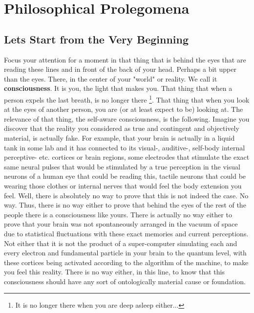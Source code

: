 \documentclass[11pt, a4paper]{article} %
\begin{document}
\newpage
\pagestyle{fancy}

\section*{\centering \huge{Philosophical Prolegomena}} %
\subsection*{Lets Start from the Very Beginning}

Focus your attention for a moment in that thing that is behind the eyes that are reading these lines and in front of the back of your head. Perhaps a bit upper than the eyes. There, in the center of your "world" or reality. We call it {\bf consciousness}. It is you, the light that makes you. That thing that when a person expels the last breath, is no longer there \footnote{It is no longer there when you are deep asleep either...}. That thing that when you look at the eyes of another person, you are (or at least expect to be) looking at. The relevance of that thing, the self-aware consciousness, is the following. Imagine you discover that the reality you considered as true and contingent and objectively material, is actually fake. For example, that your brain is actually in a liquid tank in some lab and it has connected to its visual-, auditive-, self-body internal perceptive- etc. cortices or brain regions, some electrodes that stimulate the exact same neural pulses that would be stimulated by a true perception in the visual neurons of a human eye that could be reading this, tactile neurons that could be wearing those clothes or internal nerves that would feel the body extension you feel. Well, there is absolutely no way to prove that this is not indeed the case. No way. Thus, there is no way either to prove that behind the eyes of the rest of the people there is a consciousness like yours. There is actually no way either to prove that your brain was not spontaneously arranged in the vacuum of space due to statistical fluctuations with these exact memories and current perceptions. Not either that it is not the product of a super-computer simulating each and every electron and fundamental particle in your brain to the quantum level, with these cortices being activated according to the algorithm of the machine, to make you feel this reality. There is no way either, in this line, to know that this consciousness should have any sort of ontologically material cause or foundation. \vspace{-0.3cm}
\end{document}
